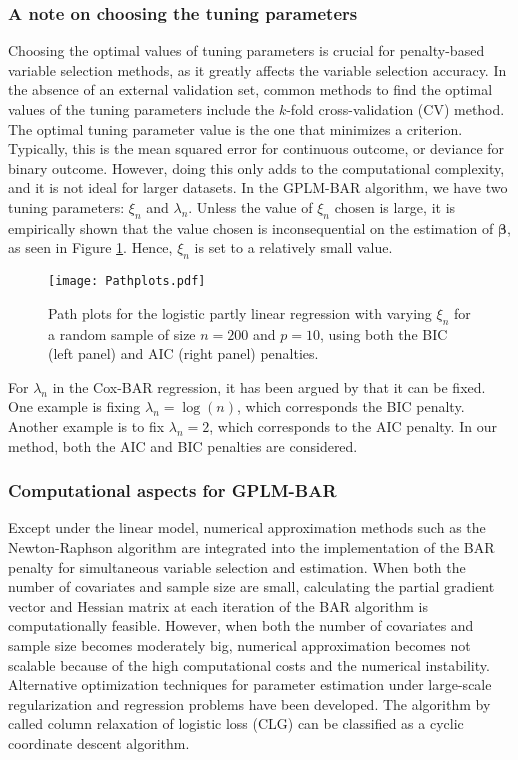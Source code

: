 \documentclass[11pt]{article}
\begin{document}
\subsubsection{A note on choosing the tuning parameters}
Choosing the optimal values of tuning parameters is crucial for penalty-based variable selection methods, as it greatly affects the variable selection accuracy. In the absence of an external validation set, common methods to find the optimal values of the tuning parameters include the $k$-fold cross-validation (CV) method. The optimal tuning parameter value is the one that minimizes a criterion. Typically, this is the mean squared error for continuous outcome, or deviance for binary outcome. However, doing this only adds to the computational complexity, and it is not ideal for larger datasets. In the GPLM-BAR algorithm, we have two tuning parameters: $\xi_n$ and $\lambda_n$. Unless the value of $\xi_n$ chosen is large, it is empirically shown that the value chosen is inconsequential on the estimation of $\boldsymbol{\beta}$, as seen in Figure \ref{path}. Hence, $\xi_n$ is set to a relatively small value. 
\begin{figure}
\centering
\texttt{[image: Pathplots.pdf]}
\caption{Path plots for the logistic partly linear regression with varying $\xi_n$ for a random sample of size $n = 200$ and $p=10$, using both the BIC (left panel) and AIC (right panel) penalties.} \label{path}
\end{figure}
For $\lambda_n$ in the Cox-BAR regression, it has been argued by \citet{kawaguchi2020surrogate}  that it can be fixed. One example is fixing $\lambda_n = \log(n)$, which corresponds the BIC penalty. Another example is to fix $\lambda_n = 2$, which corresponds to the AIC penalty. In our method,  both the AIC and BIC penalties are considered.

\subsubsection{Computational aspects for GPLM-BAR}
Except under the linear model, numerical approximation methods such as the Newton-Raphson algorithm are integrated into the implementation of the BAR penalty for simultaneous variable selection and estimation. When both the number of covariates and sample size are small, calculating the partial gradient vector and Hessian matrix at each iteration of the BAR algorithm is computationally feasible. However, when both the number of covariates and sample size becomes moderately big, numerical approximation becomes not scalable because of the high computational costs and the numerical instability. Alternative optimization techniques for parameter estimation under large-scale regularization and regression problems \citep{zhang2001text,azoury2001relative} have been developed. The algorithm by \cite{zhang2001text} called column relaxation of logistic loss (CLG) can be classified as a cyclic coordinate descent algorithm.
\end{document}
